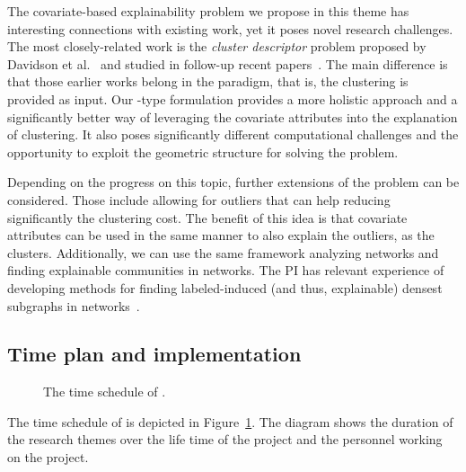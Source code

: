 \documentclass[a4paper,11pt]{article}
\begin{document}
The covariate-based explainability problem we propose in this theme
has interesting connections with existing work, yet it poses novel research challenges.
The most closely-related work is the \emph{cluster descriptor} problem
proposed by Davidson et al.~\cite{davidson2018cluster} 
and studied in follow-up recent papers~\citep{sambaturu2020efficient}.
The main difference is that those earlier works belong in the \posthoc paradigm, 
that is, the clustering is provided as input. 
Our \joint-type formulation provides a more holistic approach and a
significantly better way of leveraging the covariate attributes into the explanation of clustering. 
It also poses significantly different computational challenges
and the opportunity to exploit the geometric structure for solving the problem.

Depending on the progress on this topic, further extensions of the problem can be considered. 
Those include allowing for outliers that can help reducing significantly the clustering cost.
The benefit of this idea is that covariate attributes can be used in the same manner
to also explain the outliers, as the clusters.
Additionally, we can use the same framework analyzing networks and finding 
explainable communities in networks.
The PI has relevant experience of developing methods for finding labeled-induced
(and thus, explainable) densest subgraphs in networks~\cite{galbrun2014overlapping,galbrun2016top}.

\subsection{Time plan and implementation}


\begin{figure}[t]
\begin{center}
\vspace{-2mm}
{\small}
\end{center}
\vspace{-6mm}
\caption{\label{figure:gantt}The time schedule of {\acronym}.}
\vspace{-2mm}
\end{figure}

The time schedule of \acronym is depicted in Figure~\ref{figure:gantt}. 
The diagram shows the duration of the research themes over the life time of the project
and the personnel working on the project.
\end{document}
